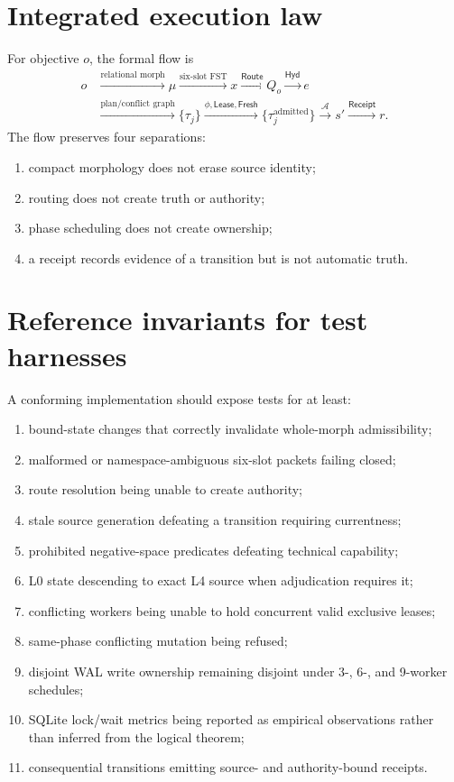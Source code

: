 \documentclass[11pt]{article}
\newcommand{\Lease}{\mathsf{Lease}}
\newcommand{\Fresh}{\mathsf{Fresh}}
\newcommand{\Receipt}{\mathsf{Receipt}}
\newcommand{\Hyd}{\mathsf{Hyd}}
\newcommand{\Route}{\mathsf{Route}}
\begin{document}
\section*{Integrated execution law}

For objective \(o\), the formal flow is
\[
\begin{aligned}
o&\xrightarrow{\text{relational morph}}\mu
\xrightarrow{\text{six-slot FST}}x
\xrightarrow{\Route}Q_o
\xrightarrow{\Hyd}e\\
&\xrightarrow{\text{plan/conflict graph}}\{\tau_j\}
\xrightarrow{\phi,\Lease,\Fresh}\{\tau_j^{\mathrm{admitted}}\}
\xrightarrow{\mathcal{A}}s'
\xrightarrow{\Receipt}r.
\end{aligned}
\]
The flow preserves four separations:
\begin{enumerate}
  \item compact morphology does not erase source identity;
  \item routing does not create truth or authority;
  \item phase scheduling does not create ownership;
  \item a receipt records evidence of a transition but is not automatic truth.
\end{enumerate}

\section*{Reference invariants for test harnesses}

A conforming implementation should expose tests for at least:
\begin{enumerate}
  \item bound-state changes that correctly invalidate whole-morph admissibility;
  \item malformed or namespace-ambiguous six-slot packets failing closed;
  \item route resolution being unable to create authority;
  \item stale source generation defeating a transition requiring currentness;
  \item prohibited negative-space predicates defeating technical capability;
  \item L0 state descending to exact L4 source when adjudication requires it;
  \item conflicting workers being unable to hold concurrent valid exclusive leases;
  \item same-phase conflicting mutation being refused;
  \item disjoint WAL write ownership remaining disjoint under 3-, 6-, and 9-worker schedules;
  \item SQLite lock/wait metrics being reported as empirical observations rather than inferred from the logical theorem;
  \item consequential transitions emitting source- and authority-bound receipts.
\end{enumerate}
\end{document}
